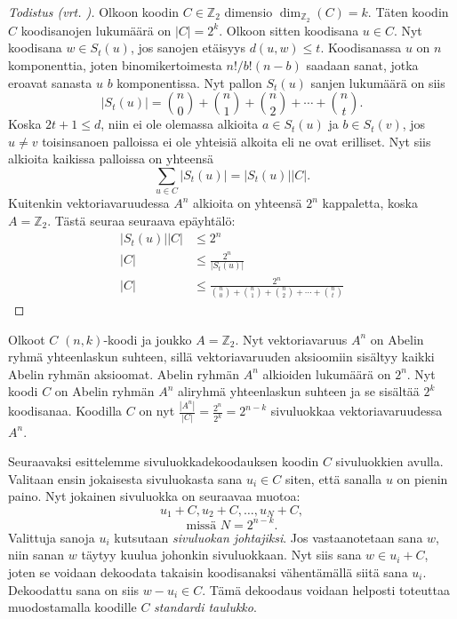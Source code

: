 \documentclass[a4paper,12pt,leqno,oneside]{report} %
\theoremstyle{plain}
\theoremstyle{plain}
\theoremstyle{definition}
\theoremstyle{remark}
\numberwithin{equation}{chapter}
\newcommand*{\Zset}{\mathbb{Z}}  %
\newcommand*{\abs}[1]{\left\lvert#1\right\rvert}   %
\begin{document}
    \begin{proof}[Todistus \upshape(vrt. {\cite[s.495]{PA}})]\label{tod:Hammingrajoitus}
        Olkoon koodin $C \in \Zset_2$ dimensio $\dim_{\Zset_2}(C) = k$. Täten koodin $C$ koodisanojen lukumäärä on $\abs{C} = 2^k$. Olkoon sitten koodisana $u \in C$. Nyt koodisana $w \in S_t(u)$, jos sanojen etäisyys $d(u,w) \le t$. Koodisanassa $u$ on $n$ komponenttia, joten binomikertoimesta $n! / b!(n-b)\!$ saadaan sanat, jotka eroavat sanasta $u$ $b$ komponentissa. Nyt pallon $S_t(u)$ sanjen lukumäärä on siis
        \[
            \abs{S_t(u)} = \binom{n}{0} + \binom{n}{1} +\binom{n}{2} +  \cdots + \binom{n}{t}.
        \]
        Koska $2t + 1 \le d$, niin ei ole olemassa alkioita $a \in S_t(u)$ ja $b \in S_t(v)$, jos $u \neq v$ toisinsanoen palloissa ei ole yhteisiä alkoita eli ne ovat erilliset. Nyt siis alkioita kaikissa palloissa on yhteensä
        \[
            \sum_{u \in C}\abs{S_t(u)} = \abs{S_t(u)}\abs{C}.
        \]
        Kuitenkin vektoriavaruudessa $A^n$ alkioita on yhteensä $2^n$ kappaletta, koska $A = \Zset_2$.
        Tästä seuraa seuraava epäyhtälö:
        \begin{align*}
            \abs{S_t(u)}\abs{C} &\le 2^n \\
            \abs{C} &\le \frac{2^n}{\abs{S_t(u)}} \\
            \abs{C} &\le \frac{2^n}{\binom{n}{0} + \binom{n}{1} +\binom{n}{2} +  \cdots + \binom{n}{t}}
        \end{align*}
    \end{proof}

    Olkoot $C$ $(n,k)$-koodi ja joukko $A = \Zset_2$. Nyt vektoriavaruus $A^n$ on Abelin ryhmä yhteenlaskun suhteen, sillä vektoriavaruuden aksioomiin sisältyy kaikki Abelin ryhmän aksioomat. Abelin ryhmän $A^n$ alkioiden lukumäärä on $2^n$. Nyt koodi $C$ on Abelin ryhmän $A^n$ aliryhmä yhteenlaskun suhteen ja se sisältää $2^k$ koodisanaa. Koodilla $C$ on nyt $\frac{\abs{A^n}}{\abs{C}} = \frac{2^n}{2^k} = 2^{n-k}$ sivuluokkaa vektoriavaruudessa $A^n$.

    Seuraavaksi esittelemme sivuluokkadekoodauksen koodin $C$ sivuluokkien avulla. Valitaan ensin jokaisesta sivuluokasta sana $u_i \in C$ siten, että sanalla $u$ on pienin paino. Nyt jokainen sivuluokka on seuraavaa muotoa:
    \[
        u_1 + C, u_2 + C, \dots, u_N + C,
    \]
    \[
        \text{missä } N = 2^{n-k}.
    \]
     Valittuja sanoja $u_i$ kutsutaan \emph{sivuluokan johtajiksi}. Jos vastaanotetaan sana $w$, niin sanan $w$ täytyy kuulua johonkin sivuluokkaan. Nyt siis sana $w \in u_i + C$, joten se voidaan dekoodata takaisin koodisanaksi vähentämällä siitä sana $u_i$. Dekoodattu sana on siis $w - u_i \in C$. Tämä dekoodaus voidaan helposti toteuttaa muodostamalla koodille $C$ \emph{standardi taulukko}.
\end{document}
